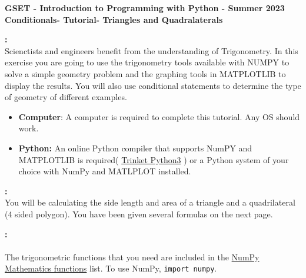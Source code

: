\documentclass[12pt]{article}
\newcommand{\MNUM}{6} %
\newcommand{\MNAME}{Conditionals} %
\newcommand{\TNAME}{Triangles and Quadralaterals} %
\begin{document}
    \thispagestyle{plain}

    \begin{center}
       {\bf \large GSET - Introduction to Programming with Python - Summer 2023} \vspace{5mm}\\
       {\bf \Large \MNAME \hspc -  Tutorial\hspc\MNUM\hspc - \TNAME}\vspace{3mm}\\      
    \end{center}

	\begin{description}[labelindent=1cm]

        \item [\textbf{\underline{Overview}}]\textbf{:} \\ 

        Scienctists and engineers benefit from the understanding of Trigonometry. In this exercise you are going to use the trigonometry tools available with NUMPY to solve a simple geometry problem and the graphing tools in MATPLOTLIB to display the results. You will also use conditional statements to determine the type of geometry of different examples.

        \item[\textbf{\underline{System Requirements:}}] \hfill \vspace{0mm}
        \begin{itemize}
            \item {\bf Computer}: A computer is required to complete this tutorial. Any OS should work.
            \item {\bf Python:} An online Python compiler that supports NumPY and MATPLOTLIB is required( \href{https://trinket.io/embed/python3/a5bd54189b}{Trinket Python3} ) or a Python system of your choice with NumPy and MATLPLOT installed.
        \end{itemize}

        \item [\textbf{\underline{Simple Geometry - Area of a Polygon}}]\textbf{:} \\

        You will be calculating the side length and area of a triangle and a quadrilateral (4 sided polygon). You have been given several formulas on the next page. \\

        \item [\textbf{\underline{Trigonometric Functions from NumPy}}]\textbf{:}\\\\ The trigonometric functions that you need are included in the \href{https://numpy.org/doc/stable/reference/routines.math.html}{NumPy Mathematics functions} list. To use NumPy, \lstinline{import numpy}.   


\end{description}
\end{document}
